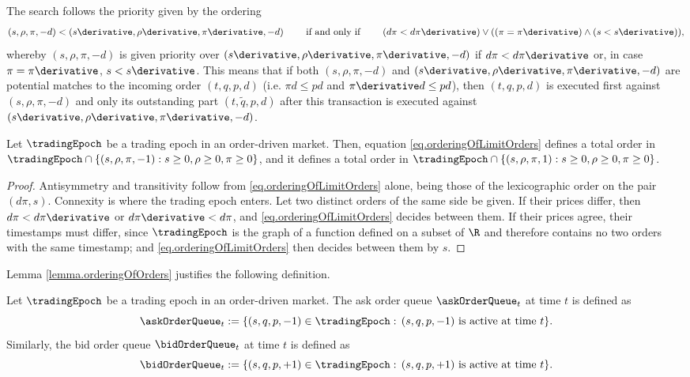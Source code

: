 The search follows the priority given by the ordering
\begin{equation}
\label{eq.orderingOfLimitOrders}
 (s,\rho,\pi,-d)<(s\derivative,\rho\derivative,\pi\derivative,-d)
 \qquad
 \text{ if and only if }
 \qquad
 (d\pi<d\pi\derivative)\vee((\pi=\pi\derivative)\wedge(s<s\derivative)),
\end{equation}
whereby $(s,\rho,\pi,-d)$ is given priority over $(s\derivative,\rho\derivative,\pi\derivative,-d)$
if $ d\pi<d\pi\derivative$ or, in case $\pi=\pi\derivative$, $s<s\derivative$.
This means that if both $(s,\rho,\pi,-d)$ and $(s\derivative,\rho\derivative,\pi\derivative,-d)$
are potential matches to the incoming order $(t, q,p,d)$
(i.e.
$\pi d \leq p d$ and
$\pi\derivative d \leq p d$),
then
$(t, q, p, d)$ is executed first against $(s, \rho, \pi, -d)$
and only its outstanding part $(t, \tilde{q}, p, d)$ after this transaction
is executed against $(s\derivative, \rho\derivative, \pi\derivative, -d)$.

\begin{lemma}
\label{lemma.orderingOfOrders}
Let $\tradingEpoch$ be a trading epoch in an order-driven market.
Then, equation \eqref{eq.orderingOfLimitOrders} defines a total order in
$\tradingEpoch\cap \lbrace (s,\rho,\pi,-1): s\geq0, \rho\geq0,\pi\geq0\rbrace$,
and it defines a total order in
$\tradingEpoch\cap \lbrace (s,\rho,\pi,1): s\geq0, \rho\geq0,\pi\geq0\rbrace$.
\end{lemma}
\begin{proof}
 Antisymmetry and transitivity follow from \eqref{eq.orderingOfLimitOrders} alone,
 being those of the lexicographic order on the pair $(d\pi, s)$.
 Connexity is where the trading epoch enters.
 Let two distinct orders of the same side be given.
 If their prices differ, then $d\pi < d\pi\derivative$ or $d\pi\derivative < d\pi$,
 and \eqref{eq.orderingOfLimitOrders} decides between them.
 If their prices agree, their timestamps must differ,
 since $\tradingEpoch$ is the graph of a function defined on a subset of $\R$
 and therefore contains no two orders with the same timestamp;
 and \eqref{eq.orderingOfLimitOrders} then decides between them by $s$.
\end{proof}
Lemma \ref{lemma.orderingOfOrders} justifies the following definition.
\begin{defi}
\label{def.orderQueue}
 Let $\tradingEpoch$ be a trading epoch in an order-driven market.
 The ask order queue $\askOrderQueue_t$ at time $t$ is defined as
 \begin{equation*}
  \askOrderQueue_t := \lbrace (s,q,p,-1)\in \tradingEpoch : \, (s,q,p,-1) \text{ is active at time } t \rbrace.
 \end{equation*}
 Similarly, the bid order queue $\bidOrderQueue_t$ at time $t$ is defined as
 \begin{equation*}
  \bidOrderQueue_t := \lbrace (s,q,p,+1) \in \tradingEpoch : \, (s,q,p,+1) \text{ is active at time } t \rbrace.
 \end{equation*}
\end{defi}

